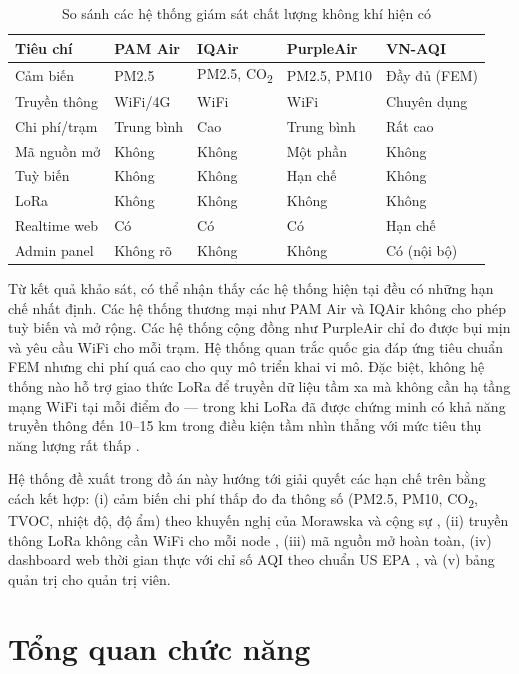\documentclass[../DoAn.tex]{subfiles}
\begin{document}
\begin{table}[H]
\centering
\caption{So sánh các hệ thống giám sát chất lượng không khí hiện có}
\label{table:so_sanh_he_thong}
\small
\begin{tabularx}{\textwidth}{|X|X|X|X|X|}
\hline
\textbf{Tiêu chí} & \textbf{PAM Air} & \textbf{IQAir} & \textbf{PurpleAir} & \textbf{VN-AQI} \\
\hline
Cảm biến & PM2.5 & PM2.5, CO\textsubscript{2} & PM2.5, PM10 & Đầy đủ (FEM) \\
\hline
Truyền thông & WiFi/4G & WiFi & WiFi & Chuyên dụng \\
\hline
Chi phí/trạm & Trung bình & Cao & Trung bình & Rất cao \\
\hline
Mã nguồn mở & Không & Không & Một phần & Không \\
\hline
Tuỳ biến & Không & Không & Hạn chế & Không \\
\hline
LoRa & Không & Không & Không & Không \\
\hline
Realtime web & Có & Có & Có & Hạn chế \\
\hline
Admin panel & Không rõ & Không & Không & Có (nội bộ) \\
\hline
\end{tabularx}
\end{table}

Từ kết quả khảo sát, có thể nhận thấy các hệ thống hiện tại đều có những hạn chế nhất định. Các hệ thống thương mại như PAM Air và IQAir không cho phép tuỳ biến và mở rộng. Các hệ thống cộng đồng như PurpleAir chỉ đo được bụi mịn và yêu cầu WiFi cho mỗi trạm. Hệ thống quan trắc quốc gia đáp ứng tiêu chuẩn FEM nhưng chi phí quá cao cho quy mô triển khai vi mô. Đặc biệt, không hệ thống nào hỗ trợ giao thức LoRa để truyền dữ liệu tầm xa mà không cần hạ tầng mạng WiFi tại mỗi điểm đo — trong khi LoRa đã được chứng minh có khả năng truyền thông đến 10--15 km trong điều kiện tầm nhìn thẳng với mức tiêu thụ năng lượng rất thấp \cite{augustin2016}.

Hệ thống đề xuất trong đồ án này hướng tới giải quyết các hạn chế trên bằng cách kết hợp: (i) cảm biến chi phí thấp đo đa thông số (PM2.5, PM10, CO\textsubscript{2}, TVOC, nhiệt độ, độ ẩm) theo khuyến nghị của Morawska và cộng sự \cite{morawska2018}, (ii) truyền thông LoRa không cần WiFi cho mỗi node \cite{augustin2016}, (iii) mã nguồn mở hoàn toàn, (iv) dashboard web thời gian thực với chỉ số AQI theo chuẩn US EPA \cite{usepa2018}, và (v) bảng quản trị cho quản trị viên.

\section{Tổng quan chức năng}
\label{section:2.2}
\end{document}
